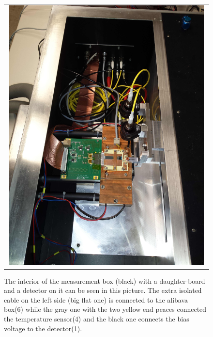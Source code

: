 \documentclass{article}
\begin{document}
\begin{figure}[tbhn]
\begin{center}
\begin{tabular}{c}
\includegraphics[width=0.98\textwidth]{pictures/InsideTheBox.jpg}
\end{tabular}
\end{center}
\caption{The interior of the measurement box (black) with a daughter-board and a detector on it can be seen in this picture. The extra isolated cable on the left side (big flat one) is connected to the alibava box(6) while the gray one with the two yellow end peaces connected the temperature sensor(4) and the black one connects the bias voltage to the detector(1).}
\label{fig:InsideTheBox}
\end{figure}
\end{document}

